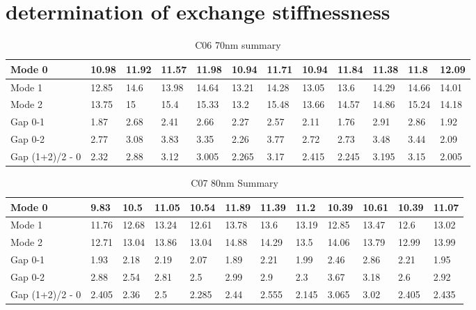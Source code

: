 \chapter{determination of exchange stiffnessness}


\begin{table}[]
\centering
\begin{tabular}{|l|l|l|l|l|l|l|l|l|l|l|l|}
\hline
Mode 0 & 10.98 & 11.92 & 11.57 & 11.98 & 10.94 & 11.71 & 10.94 & 11.84 & 11.38 & 11.8 & 12.09 \\ \hline
Mode 1 & 12.85 & 14.6 & 13.98 & 14.64 & 13.21 & 14.28 & 13.05 & 13.6 & 14.29 & 14.66 & 14.01 \\ \hline
Mode 2 & 13.75 & 15 & 15.4 & 15.33 & 13.2 & 15.48 & 13.66 & 14.57 & 14.86 & 15.24 & 14.18 \\ \hline
Gap 0-1 & 1.87 & 2.68 & 2.41 & 2.66 & 2.27 & 2.57 & 2.11 & 1.76 & 2.91 & 2.86 & 1.92 \\ \hline
Gap 0-2 & 2.77 & 3.08 & 3.83 & 3.35 & 2.26 & 3.77 & 2.72 & 2.73 & 3.48 & 3.44 & 2.09 \\ \hline
Gap (1+2)/2 - 0 & 2.32 & 2.88 & 3.12 & 3.005 & 2.265 & 3.17 & 2.415 & 2.245 & 3.195 & 3.15 & 2.005 \\ \hline
\end{tabular}
\caption{C06 70nm summary}
\label{C06summary}
\end{table}



\begin{table}[]
\centering
\begin{tabular}{|l|l|l|l|l|l|l|l|l|l|l|l|}
\hline
Mode 0 & 9.83 & 10.5 & 11.05 & 10.54 & 11.89 & 11.39 & 11.2 & 10.39 & 10.61 & 10.39 & 11.07 \\ \hline
Mode 1 & 11.76 & 12.68 & 13.24 & 12.61 & 13.78 & 13.6 & 13.19 & 12.85 & 13.47 & 12.6 & 13.02 \\ \hline
Mode 2 & 12.71 & 13.04 & 13.86 & 13.04 & 14.88 & 14.29 & 13.5 & 14.06 & 13.79 & 12.99 & 13.99 \\ \hline
Gap 0-1 & 1.93 & 2.18 & 2.19 & 2.07 & 1.89 & 2.21 & 1.99 & 2.46 & 2.86 & 2.21 & 1.95 \\ \hline
Gap 0-2 & 2.88 & 2.54 & 2.81 & 2.5 & 2.99 & 2.9 & 2.3 & 3.67 & 3.18 & 2.6 & 2.92 \\ \hline
Gap (1+2)/2 - 0 & 2.405 & 2.36 & 2.5 & 2.285 & 2.44 & 2.555 & 2.145 & 3.065 & 3.02 & 2.405 & 2.435 \\ \hline
\end{tabular}
\caption{C07 80nm Summary}
\label{C07summary}
\end{table}





